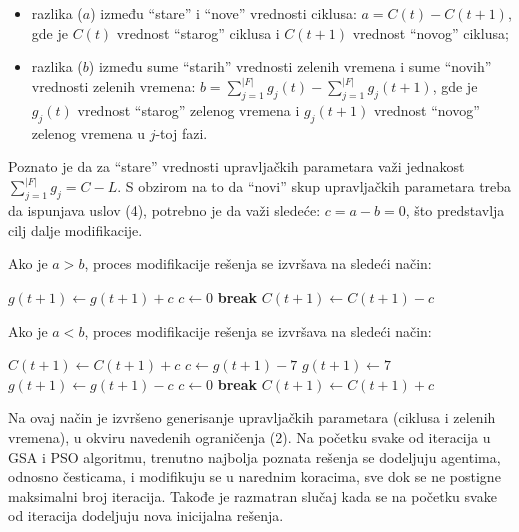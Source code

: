 \begin{itemize}
    \item razlika ($a$) između “stare” i “nove” vrednosti ciklusa: $a=C(t)-C(t+1)$, gde je $C(t)$ vrednost “starog”  ciklusa i $C(t+1)$ vrednost “novog” ciklusa;
    \item razlika ($b$) između sume “starih” vrednosti zelenih vremena i sume “novih” vrednosti zelenih vremena: $b = \sum_{j=1}^{|F|} g_j(t) - \sum_{j=1}^{|F|} g_j(t+1)$, gde je $g_j(t)$ vrednost “starog”  zelenog vremena i $g_j(t+1)$ vrednost “novog” zelenog vremena u $j$-toj fazi.
\end{itemize}

Poznato je da za “stare” vrednosti upravljačkih parametara važi jednakost $\sum_{j=1}^{|F|} g_j = C - L$. S obzirom na to da “novi” skup upravljačkih parametara treba da ispunjava uslov (4), potrebno je da važi sledeće: $c = a-b= 0$, što predstavlja cilj dalje modifikacije.

Ako je $a>b$, proces modifikacije rešenja se izvršava na sledeći način:
\begin{algorithmic}
            \State $g(t+1) \leftarrow g(t+1) + c$
            \State $c \leftarrow 0$
            \State \textbf{break}
        \EndIf
    \EndFor
        \State $C(t+1) \leftarrow C(t+1) - c$
    \EndIf
\end{algorithmic}

Ako je $a < b$, proces modifikacije rešenja se izvršava na sledeći način:
\begin{algorithmic}
    \State $C(t+1) \leftarrow C(t+1) + c$
    \Else
                \State $c \leftarrow g(t+1) - 7$
                \State $g(t+1) \leftarrow 7$
            \Else
                \State $g(t+1) \leftarrow g(t+1) - c$
                \State $c \leftarrow 0$
                \State \textbf{break}
            \EndIf
        \EndFor
            \State $C(t+1) \leftarrow C(t+1) + c$
        \EndIf
    \EndIf
\end{algorithmic}

Na ovaj način je izvršeno generisanje upravljačkih parametara (ciklusa i zelenih vremena), u okviru navedenih ograničenja (2). Na početku svake od iteracija u GSA i PSO algoritmu, trenutno najbolja poznata rešenja se dodeljuju agentima, odnosno česticama, i modifikuju se u narednim koracima, sve dok se ne postigne maksimalni broj iteracija. Takođe je razmatran slučaj kada se na početku svake od iteracija dodeljuju nova inicijalna rešenja.


